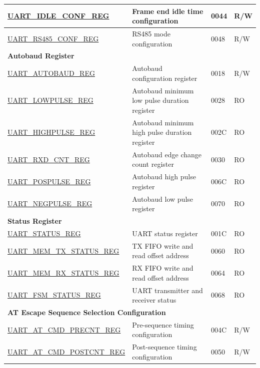 \begin{longtable}{ | p{6cm} | p{7.2cm} | p{1.3cm} | p{1cm} | }
\hyperref[regdesc:UARTIDLECONFREG]{UART\_IDLE\_CONF\_REG} & Frame end idle time configuration & \hexprefix{}0044 & R/W \\ \hline
\hyperref[regdesc:UARTRS485CONFREG]{UART\_RS485\_CONF\_REG} & RS485 mode configuration & \hexprefix{}0048 & R/W \\ \hline
\multicolumn{4}{|l|}{\textbf{Autobaud Register}} \\ \hline
\hyperref[regdesc:UARTAUTOBAUDREG]{UART\_AUTOBAUD\_REG} & Autobaud configuration register & \hexprefix{}0018 & R/W \\ \hline
\hyperref[regdesc:UARTLOWPULSEREG]{UART\_LOWPULSE\_REG} & Autobaud minimum low pulse duration register & \hexprefix{}0028 & RO \\ \hline
\hyperref[regdesc:UARTHIGHPULSEREG]{UART\_HIGHPULSE\_REG} & Autobaud minimum high pulse duration register & \hexprefix{}002C & RO \\ \hline
\hyperref[regdesc:UARTRXDCNTREG]{UART\_RXD\_CNT\_REG} & Autobaud edge change count register & \hexprefix{}0030 & RO \\ \hline
\hyperref[regdesc:UARTPOSPULSEREG]{UART\_POSPULSE\_REG} & Autobaud high pulse register & \hexprefix{}006C & RO \\ \hline
\hyperref[regdesc:UARTNEGPULSEREG]{UART\_NEGPULSE\_REG} & Autobaud low pulse register & \hexprefix{}0070 & RO \\ \hline
\multicolumn{4}{|l|}{\textbf{Status Register}} \\ \hline
\hyperref[regdesc:UARTSTATUSREG]{UART\_STATUS\_REG} & UART status register & \hexprefix{}001C & RO \\ \hline
\hyperref[regdesc:UARTMEMTXSTATUSREG]{UART\_MEM\_TX\_STATUS\_REG} & TX FIFO write and read offset address & \hexprefix{}0060 & RO \\ \hline
\hyperref[regdesc:UARTMEMRXSTATUSREG]{UART\_MEM\_RX\_STATUS\_REG} & RX FIFO write and read offset address & \hexprefix{}0064 & RO \\ \hline
\hyperref[regdesc:UARTFSMSTATUSREG]{UART\_FSM\_STATUS\_REG} & UART transmitter and receiver status & \hexprefix{}0068 & RO \\ \hline
\multicolumn{4}{|l|}{\textbf{AT Escape Sequence Selection Configuration}} \\ \hline
\hyperref[regdesc:UARTATCMDPRECNTREG]{UART\_AT\_CMD\_PRECNT\_REG} & Pre-sequence timing configuration & \hexprefix{}004C & R/W \\ \hline
\hyperref[regdesc:UARTATCMDPOSTCNTREG]{UART\_AT\_CMD\_POSTCNT\_REG} & Post-sequence timing configuration & \hexprefix{}0050 & R/W \\ \hline

\end{longtable}
